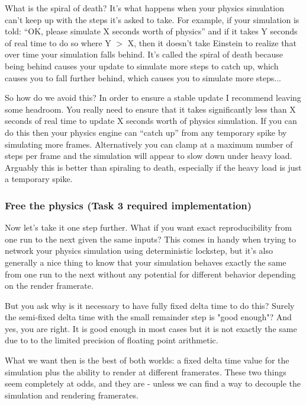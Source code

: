 \documentclass[12pt]{article}
\begin{document}
What is the spiral of death? It's what happens when your physics simulation can't keep up with the steps it's asked to take. For example, if your simulation is told: ``OK, please simulate X seconds worth of physics'' and if it takes Y seconds of real time to do so where Y $>$ X, then it doesn't take Einstein to realize that over time your simulation falls behind. It's called the spiral of death because being behind causes your update to simulate more steps to catch up, which causes you to fall further behind, which causes you to simulate more steps...

So how do we avoid this? In order to ensure a stable update I recommend leaving some headroom. You really need to ensure that it takes significantly less than X seconds of real time to update X seconds worth of physics simulation. If you can do this then your physics engine can ``catch up'' from any temporary spike by simulating more frames. Alternatively you can clamp at a maximum number of steps per frame and the simulation will appear to slow down under heavy load. Arguably this is better than spiraling to death, especially if the heavy load is just a temporary spike.

\subsubsection*{Free the physics (Task 3 required implementation)}

Now let's take it one step further. What if you want exact reproducibility from one run to the next given the same inputs? This comes in handy when trying to network your physics simulation using deterministic lockstep, but it's also generally a nice thing to know that your simulation behaves exactly the same from one run to the next without any potential for different behavior depending on the render framerate.

But you ask why is it necessary to have fully fixed delta time to do this? Surely the semi-fixed delta time with the small remainder step is "good enough"? And yes, you are right. It is good enough in most cases but it is not exactly the same due to to the limited precision of floating point arithmetic. 

What we want then is the best of both worlds: a fixed delta time value for the simulation plus the ability to render at different framerates. These two things seem completely at odds, and they are - unless we can find a way to decouple the simulation and rendering framerates. 
\end{document}
